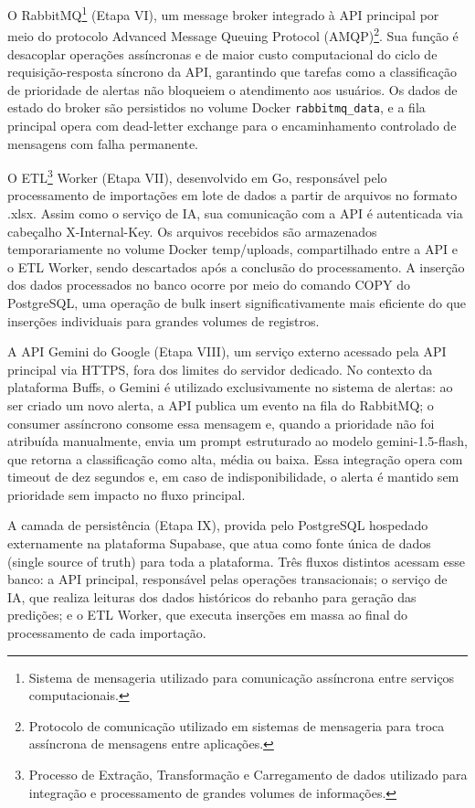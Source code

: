 \documentclass[11pt,a4paper]{article}
\begin{document}
O RabbitMQ\footnote{Sistema de mensageria utilizado para comunicação assíncrona entre serviços computacionais.} (Etapa VI), um message broker integrado à API principal por meio do protocolo Advanced Message Queuing Protocol (AMQP)\footnote{Protocolo de comunicação utilizado em sistemas de mensageria para troca assíncrona de mensagens entre aplicações.}. Sua função é desacoplar operações assíncronas e de maior custo computacional do ciclo de requisição-resposta síncrono da API, garantindo que tarefas como a classificação de prioridade de alertas não bloqueiem o atendimento aos usuários. Os dados de estado do broker são persistidos no volume Docker \texttt{rabbitmq\_data}, e a fila principal opera com dead-letter exchange para o encaminhamento controlado de mensagens com falha permanente.

O ETL\footnote{Processo de Extração, Transformação e Carregamento de dados utilizado para integração e processamento de grandes volumes de informações.} Worker (Etapa VII), desenvolvido em Go, responsável pelo processamento de importações em lote de dados a partir de arquivos no formato .xlsx. Assim como o serviço de IA, sua comunicação com a API é autenticada via cabeçalho X-Internal-Key. Os arquivos recebidos são armazenados temporariamente no volume Docker temp/uploads, compartilhado entre a API e o ETL Worker, sendo descartados após a conclusão do processamento. A inserção dos dados processados no banco ocorre por meio do comando COPY do PostgreSQL, uma operação de bulk insert significativamente mais eficiente do que inserções individuais para grandes volumes de registros.

A API Gemini do Google (Etapa VIII), um serviço externo acessado pela API principal via HTTPS, fora dos limites do servidor dedicado. No contexto da plataforma Buffs, o Gemini é utilizado exclusivamente no sistema de alertas: ao ser criado um novo alerta, a API publica um evento na fila do RabbitMQ; o consumer assíncrono consome essa mensagem e, quando a prioridade não foi atribuída manualmente, envia um prompt estruturado ao modelo gemini-1.5-flash, que retorna a classificação como alta, média ou baixa. Essa integração opera com timeout de dez segundos e, em caso de indisponibilidade, o alerta é mantido sem prioridade sem impacto no fluxo principal.

A camada de persistência (Etapa IX), provida pelo PostgreSQL hospedado externamente na plataforma Supabase, que atua como fonte única de dados (single source of truth) para toda a plataforma. Três fluxos distintos acessam esse banco: a API principal, responsável pelas operações transacionais; o serviço de IA, que realiza leituras dos dados históricos do rebanho para geração das predições; e o ETL Worker, que executa inserções em massa ao final do processamento de cada importação.
\end{document}
